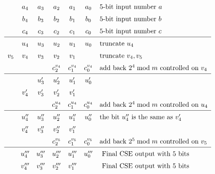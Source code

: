 \documentclass[twoside]{article}
\begin{document}
\begin{center}
\begin{figure}[h!tb]
\begin{displaymath}
\renewcommand\arraystretch{1.5}
\begin{array}{ccccccl}
        & a_4 & a_3 & a_2 & a_1 & a_0 & 5\text{-bit input number } a\\
        & b_4 & b_3 & b_2 & b_1 & b_0 & 5\text{-bit input number } b\\
        & c_4 & c_3 & c_2 & c_1 & c_0 & 5\text{-bit input number } c\\
\hline
        & u_4 & u_3 & u_2 & u_1 & u_0 & \text{truncate } u_{4} \\
    v_5 & v_4 & v_3 & v_2 & v_1 &     & \text{truncate } v_{4},v_{5} \\
        &     &     & c^{v_4}_2 & c^{v_4}_1 & c^{v_4}_0 & \text{add back } 2^4 \bmod m \text{ controlled on } v_4 \\
\hline
        &      & u'_3 & u'_2 & u'_1 & u'_0 & \\
        & v'_4 & v'_3 & v'_2 & v'_1 &      & \\
        &      &    & c^{u_4}_2 & c^{u_4}_1 & c^{u_4}_0  & \text{add back } 2^4 \bmod m \text{ controlled on } u_4 \\
\hline
        & u''_4 & u''_3 & u''_2 & u''_1 & u''_0 & \text{the bit } u''_4 \text{ is the same as } v'_4 \\
        & v''_4 & v''_3 & v''_2 & v''_1 &       &  \\
        &       &    & c^{v_5}_2 & c^{v_5}_1 & c^{v_5}_0 & \text{add back } 2^5 \bmod m \text{ controlled on } v_5 \\
\hline
        & u'''_4 & u'''_3 & u'''_2 & u'''_1 & u'''_0 & \text{ Final CSE output with } 5 \text{ bits}\\
        & v'''_4 & v'''_3 & v'''_2 & v'''_1 &        & \text{ Final CSE output with } 5 \text{ bits}\\
\end{array}

\end{displaymath}
\end{figure}
\end{center}
\end{document}
